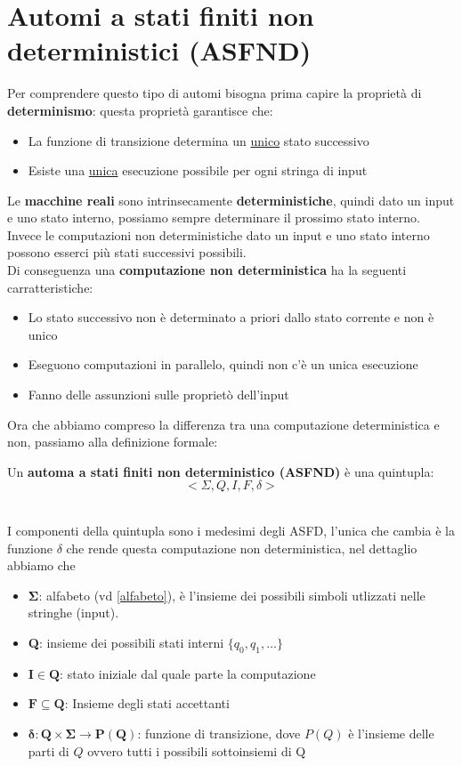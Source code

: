 \section{Automi a stati finiti non deterministici (ASFND)}
Per comprendere questo tipo di automi bisogna prima capire la proprietà di \textbf{determinismo}: questa proprietà garantisce che:
\begin{itemize}
    \item La funzione di transizione determina un \underline{unico} stato successivo
    \item Esiste una \underline{unica} esecuzione possibile per ogni stringa di input
\end{itemize}
Le \textbf{macchine reali} sono intrinsecamente \textbf{deterministiche}, quindi dato un input e uno stato interno, possiamo sempre determinare il prossimo stato interno. Invece le
computazioni non deterministiche dato un input e uno stato interno possono esserci più stati successivi possibili. \\
Di conseguenza una \textbf{computazione non deterministica} ha la seguenti carratteristiche:
\begin{itemize}
    \item Lo stato successivo non è determinato a priori dallo stato corrente e non è unico 
    \item Eseguono computazioni in parallelo, quindi non c'è un unica esecuzione
    \item Fanno delle assunzioni sulle proprietò dell'input 
\end{itemize}
Ora che abbiamo compreso la differenza tra una computazione deterministica e non, passiamo alla definizione formale:\smallskip\\
\colorbox{SALZO}{\parbox{\dimexpr\linewidth-2\fboxsep}{\begin{definition}
Un \textbf{automa a stati finiti non deterministico (ASFND)} è una quintupla: \[< \Sigma,Q, I,F,\delta  >\]   
\end{definition}}}\smallskip\\
I componenti della quintupla sono i medesimi degli ASFD, l'unica che cambia è la funzione $\delta$ che rende questa computazione non deterministica, nel dettaglio abbiamo che 
\begin{itemize}
    \item $\mathbf{\Sigma}$: alfabeto (vd \ref{alfabeto}), è l'insieme dei possibili simboli utlizzati nelle stringhe (input).
    \item \textbf{Q}: insieme dei possibili stati interni $\{ q_0,q_1,\dots  \}$
    \item $\mathbf{I \in Q}$: stato iniziale dal quale parte la computazione
    \item $\mathbf{F \subseteq Q}$: Insieme degli stati accettanti
    \item $\bm{\delta: Q\times \Sigma \to P(Q)}$: funzione di transizione, dove $P(Q)$ è l'insieme delle parti di $Q$ ovvero tutti i possibili sottoinsiemi di Q   
\end{itemize}
